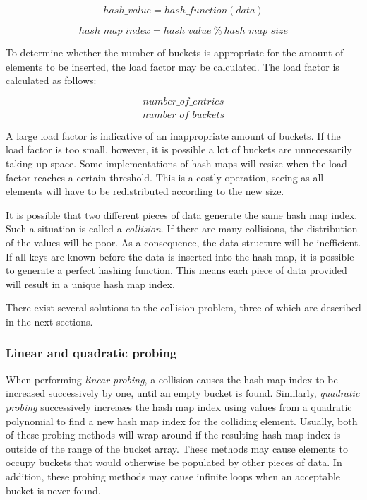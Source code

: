 \documentclass{article}
\begin{document}
\begin{equation}
  hash\_value = hash\_function(data)
\end{equation}

\begin{equation}
  hash\_map\_index = hash\_value \ \% \ hash\_map\_size
\end{equation}

To determine whether the number of buckets is appropriate for the amount of elements to be inserted,
the load factor may be calculated. The load factor is calculated as follows:

\begin{equation}
  \frac{number\_of\_entries}{number\_of\_buckets}
\end{equation}

A large load factor is indicative of an inappropriate amount of buckets.
If the load factor is too small, however, it is possible a lot of buckets are unnecessarily taking up space.
Some implementations of hash maps will resize when the load factor reaches a certain threshold.
This is a costly operation, seeing as all elements will have to be redistributed according to the new size.

It is possible that two different pieces of data generate the same hash map index.
Such a situation is called a {\em collision}. If there are many collisions, the distribution of the values
will be poor. As a consequence, the data structure will be inefficient.
If all keys are known before the data is inserted into the hash map, it is possible to generate a perfect
hashing function. This means each piece of data provided will result in a unique hash map index.

There exist several solutions to the collision problem, three of which are described in the next sections.

\subsubsection{Linear and quadratic probing}
When performing {\em linear probing}, a collision causes the hash map index to be increased successively by one,
until an empty bucket is found. Similarly, {\em quadratic probing} successively increases the hash map index using
values from a quadratic polynomial to find a new hash map index for the colliding element.
Usually, both of these probing methods will wrap around if the resulting hash map index is outside of the range
of the bucket array. These methods may cause elements to occupy buckets that would otherwise be populated by
other pieces of data. In addition, these probing methods may cause infinite loops when an acceptable bucket is
never found.
\end{document}
